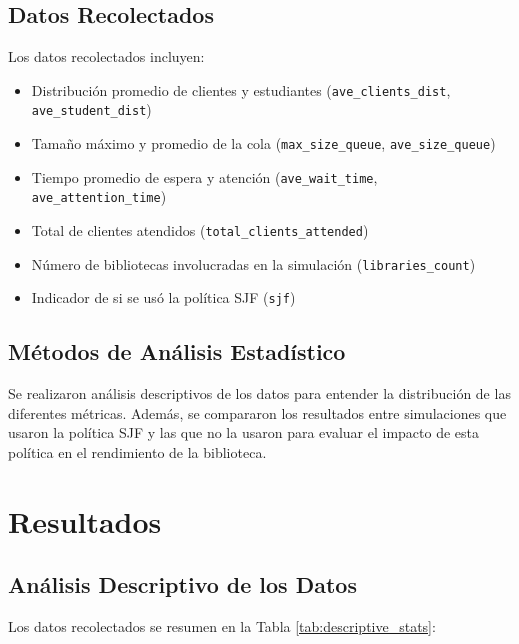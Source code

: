 \documentclass[10pt,twocolumn]{article}
\begin{document}
	\subsection{Datos Recolectados}
	Los datos recolectados incluyen:
	\begin{itemize}
		\item Distribución promedio de clientes y estudiantes (\texttt{ave\_clients\_dist}, \texttt{ave\_student\_dist})
		\item Tamaño máximo y promedio de la cola (\texttt{max\_size\_queue}, \texttt{ave\_size\_queue})
		\item Tiempo promedio de espera y atención (\texttt{ave\_wait\_time}, \texttt{ave\_attention\_time})
		\item Total de clientes atendidos (\texttt{total\_clients\_attended})
		\item Número de bibliotecas involucradas en la simulación (\texttt{libraries\_count})
		\item Indicador de si se usó la política SJF (\texttt{sjf})
	\end{itemize}
	
	\subsection{Métodos de Análisis Estadístico}
	Se realizaron análisis descriptivos de los datos para entender la distribución de las diferentes métricas. Además, se compararon los resultados entre simulaciones que usaron la política SJF y las que no la usaron para evaluar el impacto de esta política en el rendimiento de la biblioteca.
	
	\section{Resultados}
	
	\subsection{Análisis Descriptivo de los Datos}
	Los datos recolectados se resumen en la Tabla \ref{tab:descriptive_stats}:
	
\end{document}
